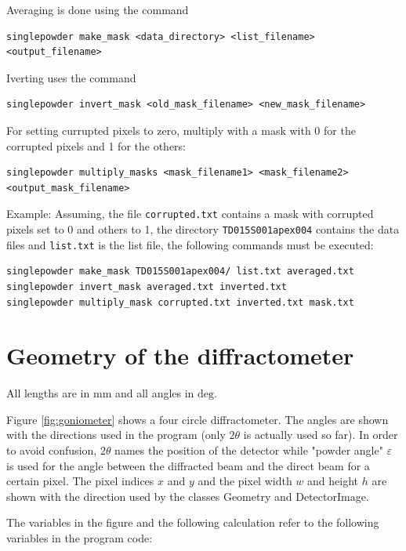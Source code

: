 \documentclass[a4paper, 12pt, twoside]{scrartcl}
\begin{document}
Averaging is done using the command

\begin{verbatim}
singlepowder make_mask <data_directory> <list_filename> <output_filename>
\end{verbatim}

Iverting uses the command

\begin{verbatim}
singlepowder invert_mask <old_mask_filename> <new_mask_filename>
\end{verbatim}

For setting currupted pixels to zero, multiply with a mask with 0 for the corrupted pixels and 1 for the others:

\begin{verbatim}
singlepowder multiply_masks <mask_filename1> <mask_filename2> <output_mask_filename>
\end{verbatim}

Example: Assuming, the file \verb|corrupted.txt| contains a mask with corrupted pixels set to 0 and others to 1, the directory \verb|TD015S001apex004| contains the data files and \verb|list.txt| is the list file, the following commands must be executed:

\begin{verbatim}
singlepowder make_mask TD015S001apex004/ list.txt averaged.txt
singlepowder invert_mask averaged.txt inverted.txt
singlepowder multiply_mask corrupted.txt inverted.txt mask.txt
\end{verbatim}

\section{Geometry of the diffractometer}

All lengths are in $ \mathrm{mm} $ and all angles in $ \mathrm{deg} $.

Figure \ref{fig:goniometer} shows a four circle diffractometer. The angles are shown with the directions used in the program (only $ 2\theta $ is actually used so far). In order to avoid confusion, $ 2\theta $ names the position of the detector while "powder angle" $ \varepsilon $ is used for the angle between the diffracted beam and the direct beam for a certain pixel. The pixel indices $ x $ and $ y $ and the pixel width $ w $ and height $ h $ are shown with the direction used by the classes Geometry and DetectorImage.

The variables in the figure and the following calculation refer to the following variables in the program code:
\end{document}
